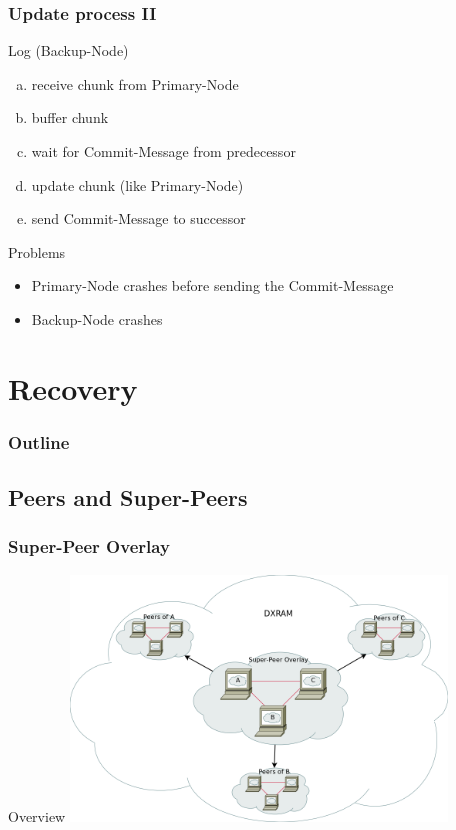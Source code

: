 \documentclass{beamer}
\begin{document}
	\begin{frame}
		\frametitle{Update process II}

		\begin{block}{Log (Backup-Node)}
			\begin{enumerate}[(a)]
				\item receive chunk from Primary-Node
				\item buffer chunk
				\item wait for Commit-Message from predecessor
				\item update chunk (like Primary-Node)
				\item send Commit-Message to successor
			\end{enumerate}
		\end{block}

		\begin{alertblock}{Problems}
			\begin{itemize}
				\item Primary-Node crashes before sending the Commit-Message
				\item Backup-Node crashes
			\end{itemize}
		\end{alertblock}
	\end{frame}

\section{Recovery}

	\begin{frame}
		\frametitle{Outline}

	\end{frame}

\subsection{Peers and Super-Peers}

	\begin{frame}
		\frametitle{Super-Peer Overlay}

		\begin{block}{Overview}
			\center\includegraphics[width=10cm]{./img/Super-Peer_Overlay}
		\end{block}
	\end{frame}
\end{document}
